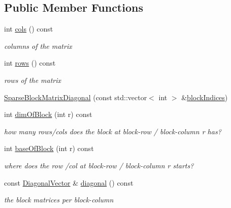 \subsection*{Public Member Functions}
\begin{DoxyCompactItemize}
\item 
int \mbox{\hyperlink{classg2o_1_1_sparse_block_matrix_diagonal_a625a8a22392617f6007520c28fdf9eb7}{cols}} () const
\begin{DoxyCompactList}\small\item\em columns of the matrix \end{DoxyCompactList}\item 
int \mbox{\hyperlink{classg2o_1_1_sparse_block_matrix_diagonal_af87f005cff6800ef0ce640d23fb651f8}{rows}} () const
\begin{DoxyCompactList}\small\item\em rows of the matrix \end{DoxyCompactList}\item 
\mbox{\hyperlink{classg2o_1_1_sparse_block_matrix_diagonal_a0e01566c4ff881af058f366672291b27}{Sparse\+Block\+Matrix\+Diagonal}} (const std\+::vector$<$ int $>$ \&\mbox{\hyperlink{classg2o_1_1_sparse_block_matrix_diagonal_aa900034ca8db34a7e2d2d51973cfceff}{block\+Indices}})
\item 
int \mbox{\hyperlink{classg2o_1_1_sparse_block_matrix_diagonal_a04163c0b9be5658ef9e8be4ccc949e5f}{dim\+Of\+Block}} (int r) const
\begin{DoxyCompactList}\small\item\em how many rows/cols does the block at block-\/row / block-\/column r has? \end{DoxyCompactList}\item 
int \mbox{\hyperlink{classg2o_1_1_sparse_block_matrix_diagonal_a4cc17dfc19f065595dd2b09de0440df5}{base\+Of\+Block}} (int r) const
\begin{DoxyCompactList}\small\item\em where does the row /col at block-\/row / block-\/column r starts? \end{DoxyCompactList}\item 
const \mbox{\hyperlink{classg2o_1_1_sparse_block_matrix_diagonal_a2eb7fc4130fac5c499b57f3bec855812}{Diagonal\+Vector}} \& \mbox{\hyperlink{classg2o_1_1_sparse_block_matrix_diagonal_a9da10533727d4bd9312a591d2e1d9361}{diagonal}} () const
\begin{DoxyCompactList}\small\item\em the block matrices per block-\/column \end{DoxyCompactList}\item 

\end{DoxyCompactItemize}
